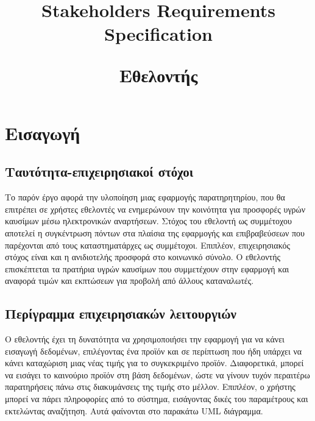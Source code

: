 \documentclass[a4paper,oneside, 12pt]{article}
\title{Stakeholders Requirements Specification\\
\begin{flushleft}
	Εθελοντής
\end{flushleft}}
\date{\vspace{-5ex}}
\begin{document}
\maketitle
\section{Εισαγωγή}
\subsection{Ταυτότητα-επιχειρησιακοί στόχοι}

Το παρόν έργο αφορά την υλοποίηση μιας εφαρμογής παρατηρητηρίου, που θα επιτρέπει 
σε χρήστες εθελοντές να ενημερώνουν την κοινότητα για προσφορές υγρών καυσίμων 
μέσω ηλεκτρονικών αναρτήσεων. Στόχος του εθελοντή ως συμμέτοχου αποτελεί η 
συγκέντρωση πόντων στα πλαίσια της εφαρμογής και επιβραβεύσεων που παρέχονται 
από τους καταστηματάρχες ως συμμέτοχοι. Επιπλέον, επιχειρησιακός στόχος είναι 
και η ανιδιοτελής προσφορά στο κοινωνικό σύνολο. Ο εθελοντής επισκέπτεται τα 
πρατήρια υγρών καυσίμων που συμμετέχουν στην εφαρμογή και αναφορά τιμών και 
εκπτώσεων για προβολή από άλλους καταναλωτές.

\subsection{Περίγραμμα επιχειρησιακών λειτουργιών}

Ο εθελοντής έχει τη δυνατότητα να χρησιμοποιήσει την εφαρμογή για να κάνει 
εισαγωγή δεδομένων, επιλέγοντας ένα προϊόν και σε περίπτωση που ήδη υπάρχει 
να κάνει καταχώριση μιας νέας τιμής για το συγκεκριμένο προϊόν. Διαφορετικά, 
μπορεί να εισάγει το καινούριο προϊόν στη βάση δεδομένων, ώστε να γίνουν 
τυχόν περαιτέρω παρατηρήσεις πάνω στις διακυμάνσεις της τιμής στο μέλλον. 
Επιπλέον, ο χρήστης μπορεί να πάρει πληροφορίες από το σύστημα, εισάγοντας 
δικές του παραμέτρους και εκτελώντας αναζήτηση. Αυτά φαίνονται στο παρακάτω 
UML διάγραμμα.
\end{document}
